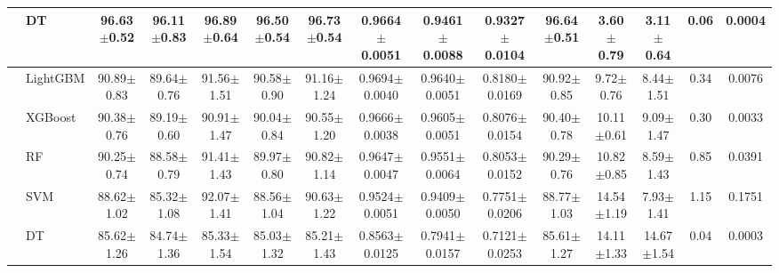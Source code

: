 \begin{tabular}{@{}llccccccccccccc@{}}
 & DT & 96.63{\tiny$\pm$0.52} & 96.11{\tiny$\pm$0.83} & 96.89{\tiny$\pm$0.64} & 96.50{\tiny$\pm$0.54} & 96.73{\tiny$\pm$0.54} & 0.9664{\tiny$\pm$0.0051} & 0.9461{\tiny$\pm$0.0088} & 0.9327{\tiny$\pm$0.0104} & 96.64{\tiny$\pm$0.51} & 3.60{\tiny$\pm$0.79} & 3.11{\tiny$\pm$0.64} & 0.06 & 0.0004\\
\midrule
{} & LightGBM & 90.89{\tiny$\pm$0.83} & 89.64{\tiny$\pm$0.76} & 91.56{\tiny$\pm$1.51} & 90.58{\tiny$\pm$0.90} & 91.16{\tiny$\pm$1.24} & 0.9694{\tiny$\pm$0.0040} & 0.9640{\tiny$\pm$0.0051} & 0.8180{\tiny$\pm$0.0169} & 90.92{\tiny$\pm$0.85} & 9.72{\tiny$\pm$0.76} & 8.44{\tiny$\pm$1.51} & 0.34 & 0.0076\\
 & XGBoost & 90.38{\tiny$\pm$0.76} & 89.19{\tiny$\pm$0.60} & 90.91{\tiny$\pm$1.47} & 90.04{\tiny$\pm$0.84} & 90.55{\tiny$\pm$1.20} & 0.9666{\tiny$\pm$0.0038} & 0.9605{\tiny$\pm$0.0051} & 0.8076{\tiny$\pm$0.0154} & 90.40{\tiny$\pm$0.78} & 10.11{\tiny$\pm$0.61} & 9.09{\tiny$\pm$1.47} & 0.30 & 0.0033\\
 & RF & 90.25{\tiny$\pm$0.74} & 88.58{\tiny$\pm$0.79} & 91.41{\tiny$\pm$1.43} & 89.97{\tiny$\pm$0.80} & 90.82{\tiny$\pm$1.14} & 0.9647{\tiny$\pm$0.0047} & 0.9551{\tiny$\pm$0.0064} & 0.8053{\tiny$\pm$0.0152} & 90.29{\tiny$\pm$0.76} & 10.82{\tiny$\pm$0.85} & 8.59{\tiny$\pm$1.43} & 0.85 & 0.0391\\
 & SVM & 88.62{\tiny$\pm$1.02} & 85.32{\tiny$\pm$1.08} & 92.07{\tiny$\pm$1.41} & 88.56{\tiny$\pm$1.04} & 90.63{\tiny$\pm$1.22} & 0.9524{\tiny$\pm$0.0051} & 0.9409{\tiny$\pm$0.0050} & 0.7751{\tiny$\pm$0.0206} & 88.77{\tiny$\pm$1.03} & 14.54{\tiny$\pm$1.19} & 7.93{\tiny$\pm$1.41} & 1.15 & 0.1751\\
 & DT & 85.62{\tiny$\pm$1.26} & 84.74{\tiny$\pm$1.36} & 85.33{\tiny$\pm$1.54} & 85.03{\tiny$\pm$1.32} & 85.21{\tiny$\pm$1.43} & 0.8563{\tiny$\pm$0.0125} & 0.7941{\tiny$\pm$0.0157} & 0.7121{\tiny$\pm$0.0253} & 85.61{\tiny$\pm$1.27} & 14.11{\tiny$\pm$1.33} & 14.67{\tiny$\pm$1.54} & 0.04 & 0.0003\\
\bottomrule
\end{tabular}